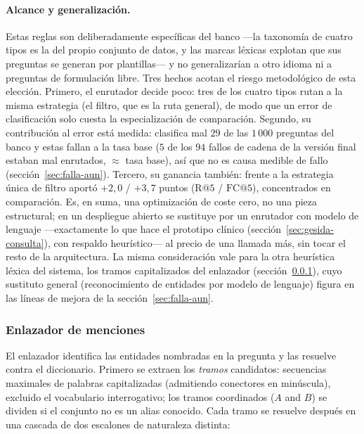 \documentclass[11pt,a4paper]{article}
\begin{document}
\paragraph{Alcance y generalización.}
Estas reglas son deliberadamente específicas del banco ---la taxonomía de
cuatro tipos es la del propio conjunto de datos, y las marcas léxicas
explotan que sus preguntas se generan por plantillas--- y no
generalizarían a otro idioma ni a preguntas de formulación libre. Tres
hechos acotan el riesgo metodológico de esta elección. Primero, el
enrutador decide poco: tres de los cuatro tipos rutan a la misma
estrategia (el filtro, que es la ruta general), de modo que un error de
clasificación solo cuesta la especialización de comparación. Segundo, su
contribución al error está medida: clasifica mal $29$ de las $1\,000$
preguntas del banco y estas fallan a la tasa base ($5$ de los $94$ fallos
de cadena de la versión final estaban mal enrutados, $\approx$ tasa base),
así que no es causa medible de fallo (sección~\ref{sec:falla-aun}).
Tercero, su ganancia también: frente a la estrategia única de filtro
aportó $+2{,}0$ / $+3{,}7$ puntos ($\mathrm{R@}5$ / $\mathrm{FC@}5$),
concentrados en comparación. Es, en suma, una optimización de coste cero,
no una pieza estructural; en un despliegue abierto se sustituye por un
enrutador con modelo de lenguaje ---exactamente lo que hace el prototipo
clínico (sección~\ref{sec:gesida-consulta}), con respaldo heurístico--- al
precio de una llamada más, sin tocar el resto de la arquitectura. La misma
consideración vale para la otra heurística léxica del sistema, los tramos
capitalizados del enlazador (sección~\ref{sec:linker}), cuyo sustituto
general (reconocimiento de entidades por modelo de lenguaje) figura en las
líneas de mejora de la sección~\ref{sec:falla-aun}.

\subsubsection{Enlazador de menciones}
\label{sec:linker}

El enlazador identifica las entidades nombradas en la pregunta y las
resuelve contra el diccionario. Primero se extraen los \emph{tramos}
candidatos: secuencias maximales de palabras capitalizadas (admitiendo
conectores en minúscula), excluido el vocabulario interrogativo; los
tramos coordinados (\guillemotleft{}$A$ and $B$\guillemotright{}) se dividen si el conjunto no es un
alias conocido. Cada tramo se resuelve después en una cascada de dos
escalones de naturaleza distinta:
\end{document}
